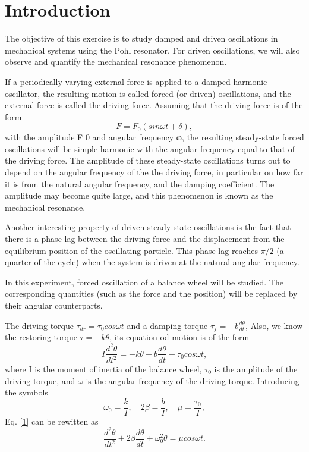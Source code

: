 \section{Introduction}
    The objective of this exercise is to study damped and driven oscillations in mechanical systems using the Pohl resonator. For driven oscillations, we will also observe and quantify the mechanical resonance phenomenon.
    
    If a periodically varying external force is applied to a damped harmonic oscillator, the resulting motion is called forced (or driven) oscillations, and the external force is called the driving force. Assuming that the driving force is of the form
    \[
        F=F_0(sin\omega t+\delta),
    \]
    with the amplitude F 0 and angular frequency ω, the resulting steady-state forced oscillations will be simple harmonic with the angular frequency equal to that of the driving force. The amplitude of these steady-state oscillations turns out to depend on the angular frequency of the the driving force, in particular on how far it is from the natural angular frequency, and the damping coefficient. The amplitude may become quite large, and this phenomenon is known as the mechanical resonance.

    Another interesting property of driven steady-state oscillations is the fact that there is a phase lag between the driving force and the displacement from the equilibrium position of the oscillating particle. This phase lag reaches $\pi/2$ (a quarter of the cycle) when the system is driven at the natural angular frequency.
    
    In this experiment, forced oscillation of a balance wheel will be studied. The corresponding quantities (such as the force and the position) will be replaced by their angular counterparts.

    The driving torque $\tau_{dr}=\tau_0cos\omega t$ and a damping torque $\tau_f=-b\frac{d\theta}{dt}$, Also, we know the restoring torque $\tau=-k\theta$, its equation od motion is of the form
    \begin{equation}\label{1}
        I\frac{d^2\theta}{dt^2}=-k\theta-b\frac{d\theta}{dt}+\tau_0cos\omega t,
    \end{equation}
    where I is the moment of inertia of the balance wheel, $\tau_0$ is the amplitude of the driving torque, and $\omega$ is the angular frequency of the driving torque. Introducing the symbols
    \[
        \omega_0=\frac{k}{I},\quad 2\beta=\frac{b}{I}, \quad \mu=\frac{\tau_0}{I},
    \]
    Eq. \ref{1} can be rewitten as
    \begin{equation}\label{2}
        \frac{d^2\theta}{dt^2}+2\beta\frac{d\theta}{dt}+\omega_0^2\theta=\mu cos\omega t.        
    \end{equation}


